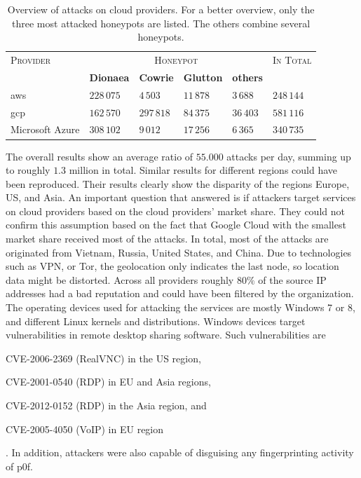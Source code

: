 \begin{table}
    \centering
    \caption[Overview of attacks on cloud providers]{Overview of attacks on cloud providers. For a better overview, only the three most attacked honeypots are listed. The others combine several honeypots.}
    \begin{tabularx}{\linewidth}{l|XXXX|l}
        \toprule
        \textsc{Provider} & \multicolumn{4}{c|}{\textsc{Honeypot}} & \textsc{In Total}                                                  \\
                          & \textbf{Dionaea}                       & \textbf{Cowrie}   & \textbf{Glutton} & \textbf{others} &           \\
        \hline
        \acl{aws}         & $228\,075$                              & $4\,503$           & $11\,878$         & $3\,688$         & $248\,144$ \\
        \acl{gcp}         & $162\,570$                              & $297\,818$         & $84\,375$         & $36\,403$        & $581\,116$ \\
        Microsoft Azure   & $308\,102$                              & $9\,012$           & $17\,256$         & $6\,365$         & $340\,735$ \\
        \bottomrule
    \end{tabularx}
    \label{tab:overview-cloud-security}
\end{table}

The overall results show an average ratio of $55.000$ attacks per day, summing up to roughly $1.3$ million in total.
Similar results for different regions could have been reproduced.
Their results clearly show the disparity of the regions Europe, US, and Asia.
An important question that \citet{Kelly2021} answered is if attackers target services on cloud providers based on the cloud providers' market share.
They could not confirm this assumption based on the fact that Google Cloud with the smallest market share received most of the attacks.
In total, most of the attacks are originated from Vietnam, Russia, United States, and China.
Due to technologies such as VPN, or Tor, the geolocation only indicates the last node, so location data might be distorted.
Across all providers roughly $80\%$ of the source IP addresses had a bad reputation and could have been filtered by the organization.
The operating devices used for attacking the services are mostly Windows 7 or 8, and different Linux kernels and distributions.
Windows devices target vulnerabilities in remote desktop sharing software. Such vulnerabilities are
\begin{enumerate*}[label=(\roman*)]
    \item CVE-2006-2369\cite{CVE-2006-2369} (RealVNC) in the US region,
    \item CVE-2001-0540\cite{CVE-2001-0540} (RDP) in EU and Asia regions,
    \item CVE-2012-0152\cite{CVE-2012-0152} (RDP) in the Asia region, and
    \item CVE-2005-4050\cite{CVE-2005-4050} (VoIP) in EU region
\end{enumerate*}.
In addition, attackers were also capable of disguising any fingerprinting activity of p0f.

